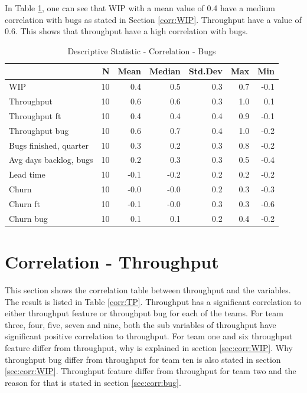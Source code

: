 \documentclass[UKenglish]{ifimaster}  %
\begin{document}
In Table \ref{DS:corr:Bugs}, one can see that WIP with a mean value of 0.4 have a medium correlation with bugs as stated in Section \ref{corr:WIP}.  Throughput  have a value of 0.6. This shows that throughput have a high correlation with bugs.

\begin{table}[!htbp]
 \centering
 \begin{tabular}{ | l | r | r | r | r | r | r | }
 \hline
& \bf{N} & \bf{Mean} & \bf{Median} & \bf{Std.Dev} & \bf{Max} & \bf{Min} \\ \hline
WIP  & 10 & 0.4 & 0.5 & 0.3 & 0.7 & -0.1\\ \hline
Throughput  & 10 & 0.6 & 0.6 & 0.3 & 1.0 & 0.1\\ \hline
Throughput ft  & 10 & 0.4 & 0.4 & 0.4 & 0.9 & -0.1\\ \hline
Throughput bug  & 10 & 0.6 & 0.7 & 0.4 & 1.0 & -0.2\\ \hline
Bugs finished, quarter  & 10 & 0.3 & 0.2 & 0.3 & 0.8 & -0.2\\ \hline
Avg days backlog, bugs  & 10 & 0.2 & 0.3 & 0.3 & 0.5 & -0.4\\ \hline
Lead time  & 10 & -0.1 & -0.2 & 0.2 & 0.2 & -0.2\\ \hline
Churn  & 10 & -0.0 & -0.0 & 0.2 & 0.3 & -0.3\\ \hline
Churn ft  & 10 & -0.1 & -0.0 & 0.3 & 0.3 & -0.6\\ \hline
Churn bug  & 10 & 0.1 & 0.1 & 0.2 & 0.4 & -0.2\\ \hline
\end{tabular}
 \caption{Descriptive Statistic - Correlation - Bugs}
 \label{DS:corr:Bugs}
 \end{table}


\section {Correlation - Throughput}
\label{sec:corr:TP}
This section shows the correlation table between throughput and the variables. The result is listed in Table \ref{corr:TP}. Throughput has a significant correlation to either throughput feature or throughput bug for each of the teams. For team three, four, five, seven and nine, both the sub variables of throughput have significant positive correlation to throughput. For team one and six throughput feature differ from throughput, why is explained in section \ref{sec:corr:WIP}.   Why throughput bug differ from throughput for team ten is also stated in section \ref{sec:corr:WIP}.    Throughput feature differ from throughput for team two and the reason for that is stated in section \ref{sec:corr:bug}.
\end{document}
